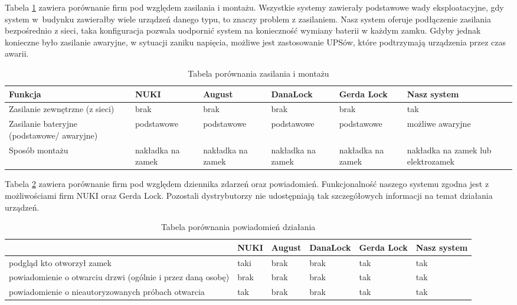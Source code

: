 \documentclass[twoside,10pt]{article}
\begin{document}
Tabela \ref{tab:porownanie2} zawiera porównanie firm pod względem zasilania i montażu. Wszystkie systemy zawierały podstawowe wady eksploatacyjne, gdy system w~budynku zawierałby wiele urządzeń danego typu, to znaczy problem z zasilaniem. Nasz system oferuje podłączenie zasilania bezpośrednio z sieci, taka konfiguracja pozwala uodpornić system na konieczność wymiany baterii w każdym zamku. Gdyby jednak konieczne było zasilanie awaryjne, w sytuacji zaniku napięcia, możliwe jest zastosowanie UPSów, które podtrzymają urządzenia przez czas awarii.
\begin{longtable}[!ht]{|m{5cm}|m{1.7cm}|m{1.7cm}|m{1.7cm}|m{2cm}|m{2.4cm}|} 
\caption{Tabela porównania zasilania i montażu}
\label{tab:porownanie2}\\
\hline
Funkcja & NUKI & August &DanaLock & Gerda Lock & Nasz system \\ \hline
Zasilanie zewnętrzne (z sieci)
& brak & brak & brak & brak & tak \\ \hline
Zasilanie bateryjne \newline (podstawowe/ awaryjne)
& podstawowe & podstawowe &podstawowe & podstawowe & możliwe \newline awaryjne \\ \hline
Sposób montażu
& nakładka na \linebreak zamek & nakładka na \linebreak zamek & nakładka na \linebreak zamek & nakładka na \linebreak zamek & nakładka na \newline zamek lub  \newline elektrozamek  \\\hline
\end{longtable}

Tabela \ref{tab:porownanie3} zawiera porównanie firm pod względem dziennika zdarzeń oraz powiadomień. Funkcjonalność naszego systemu zgodna jest z możliwościami firm NUKI oraz Gerda Lock. Pozostali dystrybutorzy nie udostępniają tak szczegółowych informacji na temat działania urządzeń.
\begin{longtable}[!ht]{|m{6cm}|m{1.4cm}|m{1.4cm}|m{1.7cm}|m{2cm}|m{2cm}|} 
\caption{Tabela porównania powiadomień działania}
\label{tab:porownanie3}\\
\hline
& NUKI & August & DanaLock & Gerda Lock & Nasz system \\ \hline
podgląd kto otworzył zamek
& taki & brak & brak & tak & tak \\ \hline
powiadomienie o otwarciu drzwi \newline (ogólnie i przez daną osobę)
& brak & brak & brak & tak & tak  \\ \hline
powiadomienie o nieautoryzowanych próbach otwarcia
& tak & brak & brak & tak & tak  \\ \hline
\end{longtable}
\end{document}
